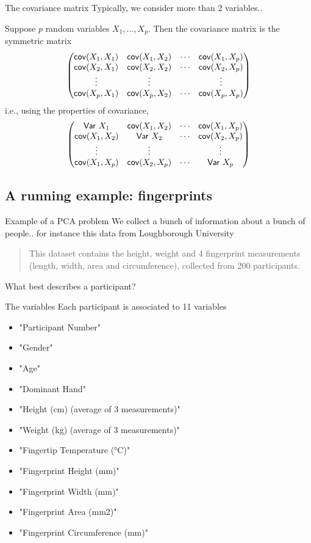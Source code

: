 \documentclass[aspectratio=169]{beamer}\usepackage[]{graphicx}\usepackage[]{xcolor}
\begin{document}
\begin{frame}{The covariance matrix}
Typically, we consider more than 2 variables.. 
\begin{definition}
Suppose $p$ random variables $X_1,\ldots,X_p$. Then the covariance matrix is the symmetric matrix
\[
\begin{pmatrix}
\mathsf{cov}(X_1,X_1) & \mathsf{cov}(X_1,X_2) & \cdots & \mathsf{cov}(X_1,X_p) \\
\mathsf{cov}(X_2,X_1) & \mathsf{cov}(X_2,X_2) & \cdots & \mathsf{cov}(X_2,X_p) \\
\vdots & \vdots & & \vdots \\
\mathsf{cov}(X_p,X_1) & \mathsf{cov}(X_p,X_2) & \cdots & \mathsf{cov}(X_p,X_p) 
\end{pmatrix}
\]
i.e., using the properties of covariance,
\[
\begin{pmatrix}
\mathsf{Var}\  X_1 & \mathsf{cov}(X_1,X_2) & \cdots & \mathsf{cov}(X_1,X_p) \\
\mathsf{cov}(X_1,X_2) & \mathsf{Var}\  X_2 & \cdots & \mathsf{cov}(X_2,X_p) \\
\vdots & \vdots & & \vdots \\
\mathsf{cov}(X_1,X_p) & \mathsf{cov}(X_2,X_p) & \cdots & \mathsf{Var}\  X_p 
\end{pmatrix}
\]
\end{definition}
\end{frame}


\subsection{A running example: fingerprints}
\begin{frame}{Example of a PCA problem}
We collect a bunch of information about a bunch of people.. for instance this data from Loughborough University
\vfill
\begin{quote}
This dataset contains the height, weight and 4 fingerprint measurements (length, width, area and circumference), collected from 200 participants.
\end{quote}
\vfill
What best describes a participant?
\end{frame}

\begin{frame}{The variables}
Each participant is associated to 11 variables
\vfill
\begin{itemize}
\item "Participant Number"
\item "Gender"
\item "Age"
\item "Dominant Hand"
\item "Height (cm) (average of 3 measurements)"
\item "Weight (kg) (average of 3 measurements)"
\item "Fingertip Temperature (°C)"
\item "Fingerprint Height (mm)"
\item "Fingerprint Width (mm)"
\item "Fingerprint Area (mm2)"
\item "Fingerprint Circumference (mm)"
\end{itemize}
\end{frame}
\end{document}
